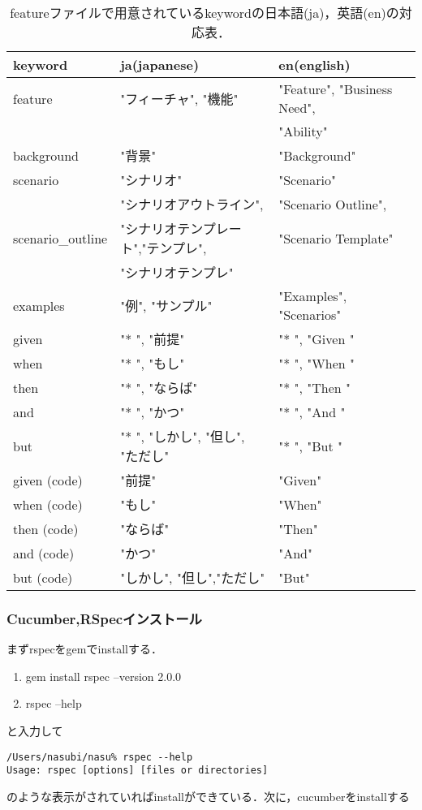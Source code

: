 \begin{table}[htbp]\begin{center}
\caption{featureファイルで用意されているkeywordの日本語(ja)，英語(en)の対応表．}
\label{table:one}
\begin{tabular}{llll}
\hline
keyword   &ja(japanese)   &en(english)  \\ \hline
 feature  & "フィーチャ", "機能"      &"Feature", "Business Need",   \\
 & &"Ability"     \\
background  &"背景"  &"Background"   \\
scenario  &"シナリオ"        &"Scenario"     \\
 &"シナリオアウトライン",  &"Scenario Outline",  \\
 scenario\_outline   &"シナリオテンプレート","テンプレ",  & "Scenario Template"   \\
 &"シナリオテンプレ"   & \\
examples  &"例", "サンプル"   &"Examples", "Scenarios"          \\
given   &"* ", "前提"        &"* ", "Given "          \\
when   &"* ", "もし"        &"* ", "When "  \\
then   &"* ", "ならば"       &"* ", "Then "  \\
and    &"* ", "かつ"        &"* ", "And "   \\
but    &"* ", "しかし", "但し", "ただし"  &"* ", "But "   \\
given (code)   &"前提"   &"Given"        \\
when (code)   &"もし"     &"When"         \\
then (code)   &"ならば"   &"Then"         \\
and (code)    &"かつ"     &"And"          \\
but (code)    &"しかし", "但し","ただし"   &"But"          \\
\hline
\end{tabular}
\label{default}
\end{center}\end{table}

\subsubsection{Cucumber,RSpecインストール}
まずrspecをgemでinstallする．

\begin{enumerate}
\item gem install rspec --version 2.0.0
\item rspec --help
\end{enumerate}
と入力して
\begin{lstlisting}[style=customCsh,basicstyle={\scriptsize\ttfamily}]
/Users/nasubi/nasu% rspec --help
Usage: rspec [options] [files or directories]
\end{lstlisting}
のような表示がされていればinstallができている．次に，cucumberをinstallする

